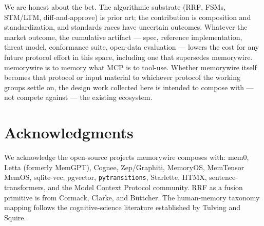 \documentclass[11pt,letterpaper,twocolumn]{article}
\begin{document}
We are honest about the bet. The algorithmic substrate (RRF, FSMs, STM/LTM, diff-and-approve) is prior art; the contribution is composition and standardization, and standards races have uncertain outcomes. Whatever the market outcome, the cumulative artifact --- spec, reference implementation, threat model, conformance suite, open-data evaluation --- lowers the cost for any future protocol effort in this space, including one that supersedes memorywire. memorywire is to memory what MCP is to tool-use. Whether memorywire itself becomes that protocol or input material to whichever protocol the working groups settle on, the design work collected here is intended to compose with --- not compete against --- the existing ecosystem.

\section*{Acknowledgments}

We acknowledge the open-source projects memorywire composes with: mem0, Letta (formerly MemGPT), Cognee, Zep/Graphiti, MemoryOS, MemTensor MemOS, sqlite-vec, pgvector, \texttt{pytransitions}, Starlette, HTMX, sentence-transformers, and the Model Context Protocol community. RRF as a fusion primitive is from Cormack, Clarke, and B{\"u}ttcher. The human-memory taxonomy mapping follows the cognitive-science literature established by Tulving and Squire.



\end{document}
